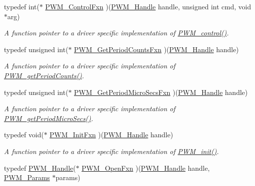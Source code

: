 \begin{DoxyCompactItemize}
typedef int($\ast$ \hyperlink{_p_w_m_8h_a6dde480b468175d730b22d7081f4678a}{P\-W\-M\-\_\-\-Control\-Fxn} )(\hyperlink{_p_w_m_8h_afdefc765f42bbad4dca246fda6e1354b}{P\-W\-M\-\_\-\-Handle} handle, unsigned int cmd, void $\ast$arg)
\begin{DoxyCompactList}\small\item\em A function pointer to a driver specific implementation of \hyperlink{_p_w_m_8h_ade999f5b12997479efa1ac85aaf46ef5}{P\-W\-M\-\_\-control()}. \end{DoxyCompactList}\item 
typedef unsigned int($\ast$ \hyperlink{_p_w_m_8h_add39d810106afecc9c4f311baf940244}{P\-W\-M\-\_\-\-Get\-Period\-Counts\-Fxn} )(\hyperlink{_p_w_m_8h_afdefc765f42bbad4dca246fda6e1354b}{P\-W\-M\-\_\-\-Handle} handle)
\begin{DoxyCompactList}\small\item\em A function pointer to a driver specific implementation of \hyperlink{_p_w_m_8h_af7c6d8e045f6f5cc8b978d68bead5b41}{P\-W\-M\-\_\-get\-Period\-Counts()}. \end{DoxyCompactList}\item 
typedef unsigned int($\ast$ \hyperlink{_p_w_m_8h_a001a5aac3f5df42fbcc00ecea8d9e7cb}{P\-W\-M\-\_\-\-Get\-Period\-Micro\-Secs\-Fxn} )(\hyperlink{_p_w_m_8h_afdefc765f42bbad4dca246fda6e1354b}{P\-W\-M\-\_\-\-Handle} handle)
\begin{DoxyCompactList}\small\item\em A function pointer to a driver specific implementation of \hyperlink{_p_w_m_8h_a150ccda2b9cb65f8c12d173bba10df53}{P\-W\-M\-\_\-get\-Period\-Micro\-Secs()}. \end{DoxyCompactList}\item 
typedef void($\ast$ \hyperlink{_p_w_m_8h_a427ec22f2d4e0ed90d90a5ee2fb0642f}{P\-W\-M\-\_\-\-Init\-Fxn} )(\hyperlink{_p_w_m_8h_afdefc765f42bbad4dca246fda6e1354b}{P\-W\-M\-\_\-\-Handle} handle)
\begin{DoxyCompactList}\small\item\em A function pointer to a driver specific implementation of \hyperlink{_p_w_m_8h_aadae3fe77e36cbf9643a22eeb99fb01e}{P\-W\-M\-\_\-init()}. \end{DoxyCompactList}\item 
typedef \hyperlink{_p_w_m_8h_afdefc765f42bbad4dca246fda6e1354b}{P\-W\-M\-\_\-\-Handle}($\ast$ \hyperlink{_p_w_m_8h_a9b5584df6c245da07aa971b217729cf1}{P\-W\-M\-\_\-\-Open\-Fxn} )(\hyperlink{_p_w_m_8h_afdefc765f42bbad4dca246fda6e1354b}{P\-W\-M\-\_\-\-Handle} handle, \hyperlink{struct_p_w_m___params}{P\-W\-M\-\_\-\-Params} $\ast$params)

\end{DoxyCompactItemize}
